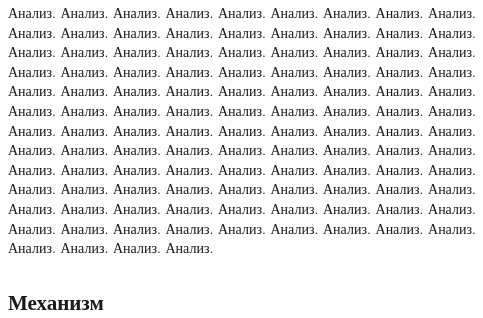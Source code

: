 Анализ. Анализ. Анализ. Анализ. Анализ. Анализ. Анализ. Анализ. Анализ. Анализ. Анализ. 
Анализ. Анализ. Анализ. Анализ. Анализ. 
Анализ. Анализ. Анализ. Анализ. Анализ. Анализ. Анализ. Анализ. Анализ. Анализ. Анализ. 
Анализ. Анализ. Анализ. Анализ. Анализ. 
Анализ. Анализ. Анализ. Анализ. Анализ. Анализ. Анализ. Анализ. Анализ. Анализ. Анализ. 
Анализ. Анализ. Анализ. Анализ. Анализ. 
Анализ. Анализ. Анализ. Анализ. Анализ. Анализ. Анализ. Анализ. Анализ. Анализ. Анализ. 
Анализ. Анализ. Анализ. Анализ. Анализ. 
Анализ. Анализ. Анализ. Анализ. Анализ. Анализ. Анализ. Анализ. Анализ. Анализ. Анализ. 
Анализ. Анализ. Анализ. Анализ. Анализ. 
Анализ. Анализ. Анализ. Анализ. Анализ. Анализ. Анализ. Анализ. Анализ. Анализ. Анализ. 
Анализ. Анализ. Анализ. Анализ. Анализ. 
Анализ. Анализ. Анализ. Анализ. Анализ. Анализ. Анализ. Анализ. Анализ. Анализ. Анализ. 
Анализ. Анализ. Анализ. Анализ. Анализ. 

\subsection{Механизм}

